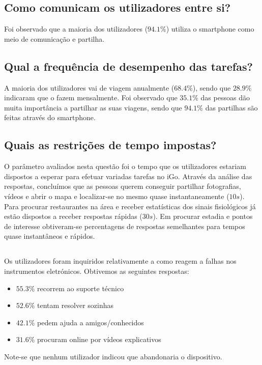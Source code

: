 \documentclass[a4paper]{article}
\begin{document}
\begin{multicols}{2}
\subsection{Como comunicam os utilizadores entre si?}
Foi observado que a maioria dos utilizadores ($94.1\%$) utiliza o smartphone
como meio de comunicação e partilha.

\subsection{Qual a frequência de desempenho das tarefas?}
A maioria dos utilizadores vai de viagem anualmente ($68.4\%$), sendo que
$28.9\%$ indicaram que o fazem mensalmente.
Foi observado que $35.1\%$ das pessoas dão muita importância a partilhar as suas
viagens, sendo que $94.1\%$ das partilhas são feitas através do smartphone.

\subsection{Quais as restrições de tempo impostas?}
O parâmetro avaliados nesta questão foi o tempo que os utilizadores estariam
dispostos a esperar para efetuar variadas tarefas no iGo. Através da análise das
respostas, concluímos que as pessoas querem conseguir partilhar fotografias, vídeos e
abrir o mapa e localizar-se no mesmo quase instantaneamente ($10s$). Para procurar restaurantes na área e
receber estatísticas dos sinais fisiológicos já estão dispostos a receber
respostas rápidas ($30s$). Em procurar estadia e pontos de interesse obtiveram-se
percentagens de respostas semelhantes para tempos quase instantâneos e rápidos.
\subsection{}
Os utilizadores foram inquiridos relativamente a como reagem a falhas nos
instrumentos eletrónicos. Obtivemos as seguintes respostas:
\begin{itemize}
  \item $55.3\%$ recorrem ao suporte técnico
  \item $52.6\%$ tentam resolver sozinhas
  \item $42.1\%$ pedem ajuda a amigos/conhecidos
  \item $31.6\%$ procuram online por vídeos explicativos
\end{itemize}
Note-se que nenhum utilizador indicou que abandonaria o dispositivo.
\end{multicols}
\end{document}
